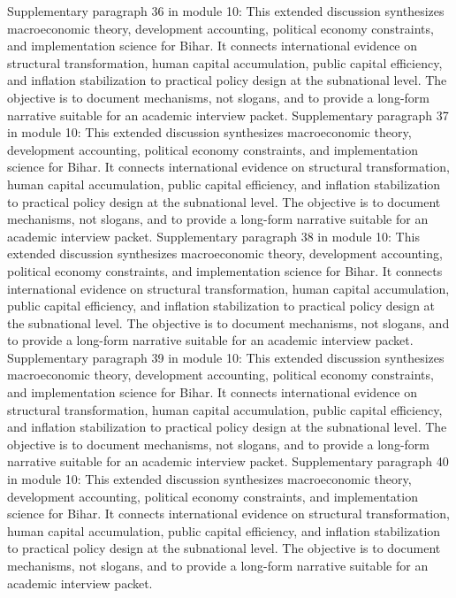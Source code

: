 \documentclass[preprint,12pt]{elsarticle}
\begin{document}
Supplementary paragraph 36 in module 10: This extended discussion synthesizes macroeconomic theory, development accounting, political economy constraints, and implementation science for Bihar. It connects international evidence on structural transformation, human capital accumulation, public capital efficiency, and inflation stabilization to practical policy design at the subnational level. The objective is to document mechanisms, not slogans, and to provide a long-form narrative suitable for an academic interview packet.
Supplementary paragraph 37 in module 10: This extended discussion synthesizes macroeconomic theory, development accounting, political economy constraints, and implementation science for Bihar. It connects international evidence on structural transformation, human capital accumulation, public capital efficiency, and inflation stabilization to practical policy design at the subnational level. The objective is to document mechanisms, not slogans, and to provide a long-form narrative suitable for an academic interview packet.
Supplementary paragraph 38 in module 10: This extended discussion synthesizes macroeconomic theory, development accounting, political economy constraints, and implementation science for Bihar. It connects international evidence on structural transformation, human capital accumulation, public capital efficiency, and inflation stabilization to practical policy design at the subnational level. The objective is to document mechanisms, not slogans, and to provide a long-form narrative suitable for an academic interview packet.
Supplementary paragraph 39 in module 10: This extended discussion synthesizes macroeconomic theory, development accounting, political economy constraints, and implementation science for Bihar. It connects international evidence on structural transformation, human capital accumulation, public capital efficiency, and inflation stabilization to practical policy design at the subnational level. The objective is to document mechanisms, not slogans, and to provide a long-form narrative suitable for an academic interview packet.
Supplementary paragraph 40 in module 10: This extended discussion synthesizes macroeconomic theory, development accounting, political economy constraints, and implementation science for Bihar. It connects international evidence on structural transformation, human capital accumulation, public capital efficiency, and inflation stabilization to practical policy design at the subnational level. The objective is to document mechanisms, not slogans, and to provide a long-form narrative suitable for an academic interview packet.
\end{document}
